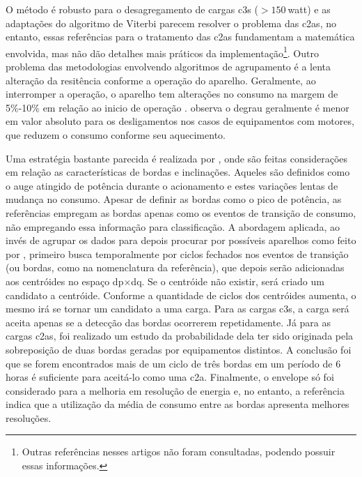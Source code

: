 \begin{enumerate}[label=\textbf{1.\arabic*},wide=\parindent]
O método é robusto para o desagregamento de cargas \glspl{c3}
($> 150~$\acrshort{watt}) e as adaptações \cite{nilm_bouloutas_viterbi_ext_1991_11,
nilm_hart_fsm_viterbi_1993_12} do algoritmo de Viterbi
parecem resolver o problema das \glspl{c2a}, no entanto, essas
referências para o tratamento das \glspl{c2a} fundamentam a
matemática envolvida, mas não dão detalhes mais práticos da
implementação\footnote{Outras referências nesses artigos
não foram consultadas, podendo possuir essas informações.}.
Outro problema das metodologias envolvendo
algoritmos de agrupamento é a lenta alteração da resitência conforme a
operação do aparelho. Geralmente, ao interromper a operação, o
aparelho tem alterações no consumo na margem de 5\%-10\% em relação ao
inicio de operação \cite{nilm_sultanem_1991_10}.
\citeauthor*{nilm_hart_1992_8} observa o degrau geralmente é
menor em valor absoluto para os desligamentos nos casos de
equipamentos com motores, que reduzem o consumo conforme seu
aquecimento.

Uma estratégia bastante parecida é realizada por
\citet*{nilm_cole_data_extraction_1998_14,nilm_cole_extra_info_surge_1998_15}, 
onde são feitas considerações em relação as características de bordas e
inclinações. Aqueles são definidos como o auge atingido de potência
durante o acionamento e estes variações lentas de mudança no consumo.
Apesar de definir as bordas como o pico de potência, as referências
empregam as bordas apenas como os eventos de transição de consumo, não
empregando essa informação para classificação. A abordagem aplicada,
ao invés de agrupar os dados para depois procurar por possíveis
aparelhos como feito por \citeauthor*{nilm_hart_1992_8}, primeiro
busca temporalmente por ciclos fechados nos eventos de transição (ou
bordas, como na nomenclatura da referência), que depois serão
adicionadas aos centróides no espaço
\acrshort{dp}$\times$\acrshort{dq}. Se o centróide não existir, será
criado um candidato a centróide. Conforme a quantidade de ciclos dos
centróides aumenta, o mesmo irá se tornar um candidato a uma carga.
Para as cargas \glspl{c3}, a carga será aceita apenas se a detecção
das bordas ocorrerem repetidamente. Já para as cargas \glspl{c2a}, foi
realizado um estudo da probabilidade dela ter sido originada pela
sobreposição de duas bordas geradas por equipamentos distintos. A
conclusão foi que se forem encontrados mais de um ciclo de três bordas
em um período de 6 horas é suficiente para aceitá-lo como uma
\gls{c2a}. Finalmente, o envelope só foi considerado para a melhoria
em resolução de energia e, no entanto, a referência indica que a
utilização da média de consumo entre as bordas apresenta melhores
resoluções.


\end{enumerate}
